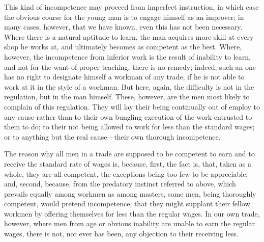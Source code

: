 This kind of incompetence may proceed from imperfect instruction, in
which case the obvious course for the young man is to engage himself
as an improver; in many cases, however, that we have known, even this
has not been necessary. Where there is a natural aptitude to learn, the
man acquires more skill at every shop he works at, and ultimately
becomes as competent as the best. Where, however, the incompetence from
inferior work is the result of inability to learn, and not for the want
of proper teaching, there is no remedy; indeed, such an one has no
right to designate himself a workman of any trade, if he is not able to
work at it in the style of a workman. But here, again, the difficulty is
not in the regulation, but in the man himself. These, however, are the
men most likely to complain of this regulation. They will lay their
being continually out of employ to any cause rather than to their own
bungling execution of the work entrusted to them to do; to their not
being allowed to work for less than the standard wages; or to anything
but the real cause---their own thorough incompetence.

The reason why all men in a trade are supposed to be competent to earn
and to receive the standard rate of wages is, because, first, the fact
is, that, taken as a whole, they are all competent, the exceptions being
too few to be appreciable; and, second, because, from the predatory
instinct referred to above, which prevails equally among workmen as
among masters, some men, being thoroughly competent, would pretend
incompetence, that they might supplant their fellow workmen by offering
themselves for less than the regular wages. In our own trade, however,
where men from age or obvious inability are unable to earn the regular
wages, there is not, nor ever has been, any objection to their receiving
less.

